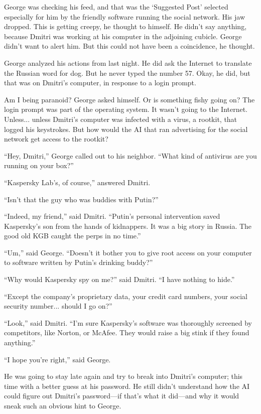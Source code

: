 \documentclass{memoir}
\begin{document}
George was checking his feed, and that was the `Suggested Post' selected especially for him by the friendly software running the social network. His jaw dropped. This is getting creepy, he thought to himself. He didn't say anything, because Dmitri was working at his computer in the adjoining cubicle. George didn't want to alert him. But this could not have been a coincidence, he thought. 

George analyzed his actions from last night. He did ask the Internet to translate the Russian word for dog. But he never typed the number 57. Okay, he did, but that was on Dmitri's computer, in response to a login prompt. 

Am I being paranoid? George asked himself. Or is something fishy going on? The login prompt was part of the operating system. It wasn't going to the Internet. Unless... unless Dmitri's computer was infected with a virus, a rootkit, that logged his keystrokes. But how would the AI that ran advertising for the social network get access to the rootkit? 

``Hey, Dmitri,'' George called out to his neighbor. ``What kind of antivirus are you running on your box?''

``Kaspersky Lab's, of course,'' answered Dmitri. 

``Isn't that the guy who was buddies with Putin?''

``Indeed, my friend,'' said Dmitri. ``Putin's personal intervention saved Kaspersky's son from the hands of kidnappers. It was a big story in Russia. The good old KGB caught the perps in no time.''

``Um,'' said George. ``Doesn't it bother you to give root access on your computer to software written by Putin's drinking buddy?''

``Why would Kaspersky spy on me?'' said Dmitri. ``I have nothing to hide.''

``Except the company's proprietary data, your credit card numbers, your social security number... should I go on?''

``Look,'' said Dmitri. ``I'm sure Kaspersky's software was thoroughly screened by competitors, like Norton, or McAfee. They would raise a big stink if they found anything.''

``I hope you're right,'' said George. 

He was going to stay late again and try to break into Dmitri's computer; this time with a better guess at his password. He still didn't understand how the AI could figure out Dmitri's password---if that's what it did---and why it would sneak such an obvious hint to George.
\end{document}
